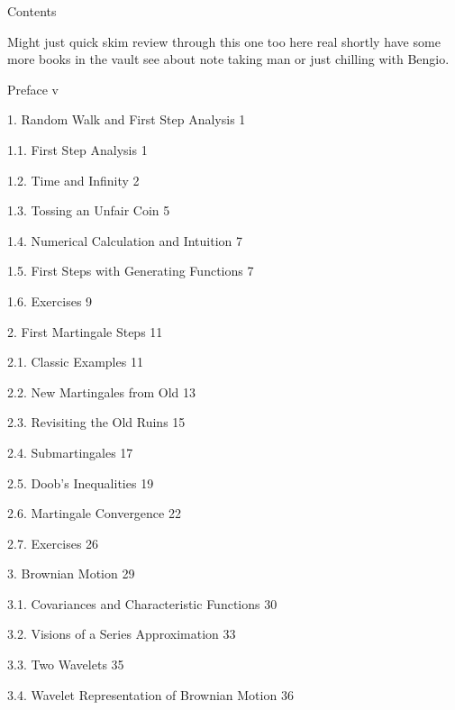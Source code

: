 Contents

Might just quick skim review through this one too here real shortly have some more books in the vault see about note taking man or just chilling with Bengio.

Preface v



1. Random Walk and First Step Analysis 1



1.1. First Step Analysis 1



1.2. Time and Infinity 2



1.3. Tossing an Unfair Coin 5



1.4. Numerical Calculation and Intuition 7



1.5. First Steps with Generating Functions 7



1.6. Exercises 9



2. First Martingale Steps 11



2.1. Classic Examples 11



2.2. New Martingales from Old 13



2.3. Revisiting the Old Ruins 15



2.4. Submartingales 17



2.5. Doob's Inequalities 19



2.6. Martingale Convergence 22



2.7. Exercises 26



3. Brownian Motion 29



3.1. Covariances and Characteristic Functions 30



3.2. Visions of a Series Approximation 33



3.3. Two Wavelets 35



3.4. Wavelet Representation of Brownian Motion 36



